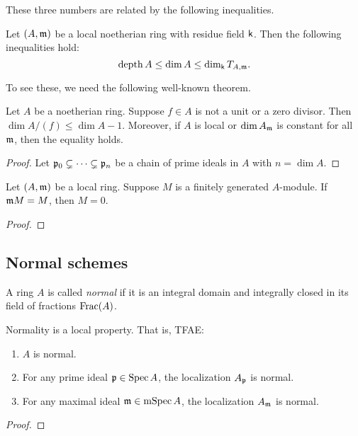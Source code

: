     These three numbers are related by the following inequalities.
    \begin{proposition}
        Let $(A,{\mathfrak{m}})$ be a local noetherian ring with residue field $\mathsf{k}$.
        Then the following inequalities hold:
        \[ \operatorname{depth} A \leq \dim A \leq \dim_{\mathsf{k}} T_{A,{\mathfrak{m}}}. \]
    \end{proposition}

    To see these, we need the following well-known theorem.

    
    \begin{theorem}
        Let $A$ be a noetherian ring.
        Suppose $f \in A$ is not a unit or a zero divisor.
        Then $\dim A/(f) \leq \dim A - 1$.
        Moreover, if $A$ is local or $\dim A_{\mathfrak{m}}$ is constant for all ${\mathfrak{m}}$, then the equality holds.
    \end{theorem}
    \begin{proof}
        Let ${\mathfrak{p}}_0 \subsetneq \cdots \subsetneq {\mathfrak{p}}_n$ be a chain of prime ideals in $A$ with $n = \dim A$.

    \end{proof}

    \begin{theorem}
        Let $(A,{\mathfrak{m}})$ be a local ring.
        Suppose $M$ is a finitely generated $A$-module.
        If ${\mathfrak{m}} M = M$, then $M = 0$.
    \end{theorem}
    \begin{proof}
    \end{proof}

\subsection{Normal schemes}


    \begin{definition}
        A ring $A$ is called \textit{normal} if it is an integral domain and integrally closed in its field of fractions $\mathrm{Frac}(A)$.
    \end{definition}

    \begin{proposition}
        Normality is a local property. 
        That is, TFAE:
        \begin{enumerate}[label=(\alph*)]
            \item $A$ is normal.
            \item For any prime ideal ${\mathfrak{p}} \in \operatorname{Spec} A$, the localization $A_{\mathfrak{p}}$ is normal.
            \item For any maximal ideal ${\mathfrak{m}} \in \operatorname{mSpec} A$, the localization $A_{\mathfrak{m}}$ is normal.
        \end{enumerate}
    \end{proposition}
    \begin{proof}
        
    \end{proof}

